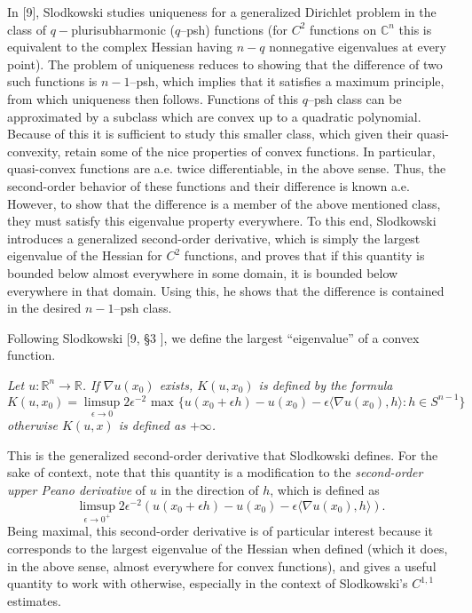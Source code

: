 \documentclass[10pt]{article}
\newenvironment{definition}[2][Definition]{\begin{trivlist}
\item[\hskip \labelsep {\bfseries #1}\hskip \labelsep {\bfseries #2.}]}{\end{trivlist}}
\begin{document}
In [9], Slodkowski studies uniqueness for a generalized Dirichlet problem in the class of $q-$plurisubharmonic ($q$--psh) functions (for $C^2$ functions on $\mathbb{C}^n$ this is equivalent to the complex Hessian having $n-q$ nonnegative eigenvalues at every point). The problem of uniqueness reduces to showing that the difference of two such functions is $n-1$--psh, which implies that it satisfies a maximum principle, from which uniqueness then follows. Functions of this $q$--psh class can be approximated by a subclass which are convex up to a quadratic polynomial. Because of this it is sufficient to study this smaller class, which given their quasi-convexity, retain some of the nice properties of convex functions. In particular, quasi-convex functions are a.e. twice differentiable, in the above sense. Thus, the second-order behavior of these functions and their difference is known a.e. However, to show that the difference is a member of the above mentioned class, they must satisfy this eigenvalue property everywhere. To this end, Slodkowski introduces a generalized second-order derivative, which is simply the largest eigenvalue of the Hessian for $C^2$ functions, and proves that if this quantity is bounded below almost everywhere in some domain, it is bounded below everywhere in that domain. Using this, he shows that the difference is contained in the desired $n-1$--psh class.

\vspace{.1in}
Following Slodkowski [9, \S 3 ], we define the largest \textquotedblleft eigenvalue\textquotedblright \hspace{.1mm} of a convex function.

\begin{definition} {1.1} \textit{Let $u:\mathbb{R}^n \rightarrow \mathbb{R}$. If $\nabla u(x_0)$ exists, $K(u,x_0)$ is defined by the formula 
$$K(u,x_0) = \limsup_{\epsilon \rightarrow 0} 2\epsilon^{-2} \text{ max } \{ u(x_0 + \epsilon h)  - u(x_0) - \epsilon \langle \nabla u(x_0), h \rangle : h\in S^{n-1} \}$$ otherwise $K(u,x)$ is defined as $+\infty$.}
\end{definition}

This is the generalized second-order derivative that Slodkowski defines. For the sake of context, note that this quantity is a modification to the \textit{second-order upper Peano derivative} of $u$ in the direction of $h$, which is defined as 
$$ \limsup_{\epsilon \rightarrow 0^+}2\epsilon^{-2} (u(x_0+\epsilon h)-u(x_0)-\epsilon \langle \nabla u(x_0),h \rangle).$$ 
Being maximal, this second-order derivative is of particular interest because it corresponds to the largest eigenvalue of the Hessian when defined (which it does, in the above sense, almost everywhere for convex functions), and gives a useful quantity to work with otherwise, especially in the context of Slodkowski's $C^{1,1}$ estimates.
\end{document}
